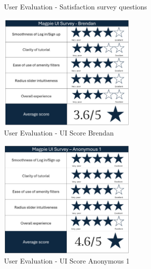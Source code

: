 \begin{figure}[h!]
    \centering
    \caption{User Evaluation - Satisfaction survey questions}
    \label{fig:userevalquestions}
\end{figure}
\begin{figure}[h!]
    \centering
    \includegraphics[width=0.6\textwidth]{images/survey-brendan.png}
    \caption{User Evaluation - UI Score Brendan}
    \label{fig:brendanscore}
\end{figure}
\begin{figure}[h!]
    \centering
    \includegraphics[width=0.6\textwidth]{images/survey-maira.png}
    \caption{User Evaluation - UI Score Anonymous 1}
    \label{fig:mairascore}
\end{figure}
